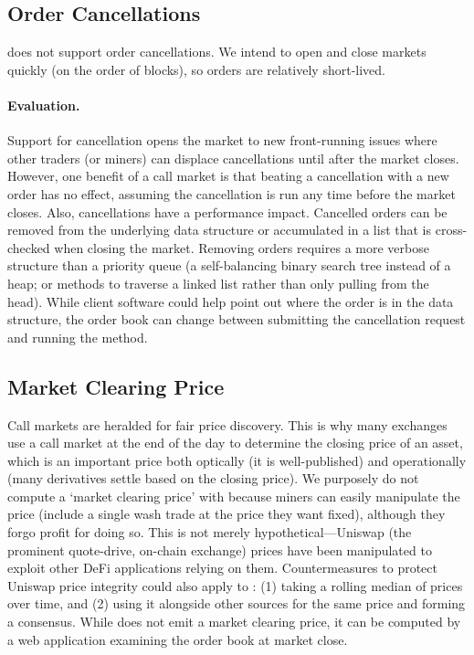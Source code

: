 
\subsection{Order Cancellations}

\cm does not support order cancellations. We intend to open and close markets quickly (on the order of blocks), so orders are relatively short-lived.

\paragraph{Evaluation.} Support for cancellation opens the market to new front-running issues where other traders (or miners) can displace cancellations until after the market closes. However, one benefit of a call market is that beating a cancellation with a new order has no effect, assuming the cancellation is run any time before the market closes. Also, cancellations have a performance impact. Cancelled orders can be removed from the underlying data structure or accumulated in a list that is cross-checked when closing the market. Removing orders requires a more verbose structure than a priority queue (\eg a self-balancing binary search tree instead of a heap; or methods to traverse a linked list rather than only pulling from the head). While client software could help point out where the order is in the data structure, the order book can change between submitting the cancellation request and running the method. %


\subsection{Market Clearing Price}

Call markets are heralded for fair price discovery. This is why many exchanges use a call market at the end of the day to determine the closing price of an asset, which is an important price both optically (it is well-published) and operationally (many derivatives settle based on the closing price). We purposely do not compute a `market clearing price' with \cm because miners can easily manipulate the price (\ie include a single wash trade at the price they want fixed), although they forgo profit for doing so. This is not merely hypothetical---Uniswap (the prominent quote-drive, on-chain exchange) prices have been manipulated to exploit other DeFi applications relying on them. Countermeasures to protect Uniswap price integrity could also apply to \cm: (1) taking a rolling median of prices over time, and (2) using it alongside other sources for the same price and forming a consensus. While \cm does not emit a market clearing price, it can be computed by a web application examining the order book at market close.

